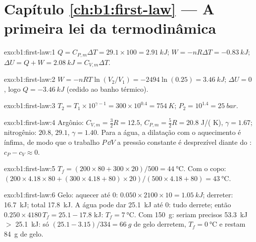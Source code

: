 \section*{Capítulo \ref{ch:b1:first-law} --- A primeira lei da termodinâmica}

\begin{solution}{exo:b1:first-law:1}
$Q = C_{P,m}\Delta T = 29.1 \times 100 = \qty{2.91}{kJ}$; $W = -nR\Delta T =
\qty{-0.83}{kJ}$; $\Delta U = Q + W = \qty{2.08}{kJ} = C_{V,m}\Delta T$.
\end{solution}

\begin{solution}{exo:b1:first-law:2}
$W = -nRT\ln(V_2/V_1) = -2494\ln(0.25) = \qty{+3.46}{kJ}$; $\Delta U = 0$, logo
$Q = \qty{-3.46}{kJ}$ (cedido ao banho térmico).
\end{solution}

\begin{solution}{exo:b1:first-law:3}
$T_2 = T_1 \times 10^{\gamma - 1} = 300 \times 10^{0.4} = \qty{754}{K}$; $P_2 =
10^{1.4} = \qty{25}{bar}$.
\end{solution}

\begin{solution}{exo:b1:first-law:4}
Argônio: $C_{V,m} = \tfrac32 R = 12.5$, $C_{P,m} = \tfrac52 R = 20.8$ J/( K),
$\gamma = 1.67$; nitrogênio: $20.8$, $29.1$, $\gamma = 1.40$. Para a água, a
dilatação com o aquecimento é ínfima, de modo que o trabalho $P\,\dd V$ a pressão constante
é desprezível diante do : $c_P - c_V \approx 0$.
\end{solution}

\begin{solution}{exo:b1:first-law:5}
$T_f = (200 \times 80 + 300 \times 20)/500 = \qty{44}{\degreeCelsius}$. Com o
copo: $(200 \times 4.18 \times 80 + (300 \times 4.18 + 80) \times 20)/(500 \times
4.18 + 80) = \qty{43}{\degreeCelsius}$.
\end{solution}

\begin{solution}{exo:b1:first-law:6}
Gelo: aquecer até $0$: $0.050 \times 2100 \times 10 = \qty{1.05}{kJ}$; derreter:
\qty{16.7}{kJ}; total \qty{17.8}{kJ}. A água pode dar \qty{25.1}{kJ} até
$0$: tudo derrete; então $0.250 \times 4180\,T_f = 25.1 - 17.8$ kJ: $T_f =
\qty{7}{\degreeCelsius}$. Com \qty{150}{g}: seriam precisos \qty{53.3}{kJ} $>$ \qty{25.1}{kJ}:
só $(25.1 - 3.15)/334 = \qty{66}{g}$ de gelo derretem, $T_f = \qty{0}{\degreeCelsius}$
e restam \qty{84}{g} de gelo.
\end{solution}


